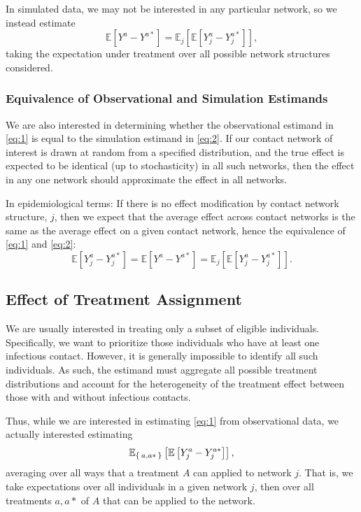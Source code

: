\documentclass{article}
\theoremstyle{definition}
\begin{document}
In simulated data, we may not be interested in any particular network, so we instead estimate
\begin{equation}\label{eq:3}
    \mathbb{E}\left[Y^{a}-Y^{a*}\right]=\mathbb{E}_{j}\left[\mathbb{E}\left[Y_{j}^{a}-Y_{j}^{a*}\right]\right],
\end{equation}
taking the expectation under treatment over all possible network structures considered. 
\subsubsection{Equivalence of Observational and Simulation Estimands}
We are also interested in determining whether the observational estimand in \ref{eq:1} is equal to the simulation estimand in \ref{eq:2}. If our contact network of interest is drawn at random from a specified distribution, and the true effect is expected to be identical (up to stochasticity) in all such networks, then the effect in any one network should approximate the effect in all networks.

In epidemiological terms: If there is no effect modification by contact network structure, $j$, then we expect that the average effect across contact networks is the same as the average effect on a given contact network, hence the equivalence of \ref{eq:1} and \ref{eq:2}:
\begin{equation}\label{eq:4}
      \mathbb{E}\left[Y_{j}^{a}-Y_{j}^{a*}\right]=\mathbb{E}\left[Y^{a}-Y^{a*}\right]=\mathbb{E}_{j}\left[\mathbb{E}\left[Y_{j}^{a}-Y_{j}^{a*}\right]\right].
\end{equation}
\subsection{Effect of Treatment Assignment}
We are usually interested in treating only a subset of eligible individuals. Specifically, we want to prioritize those individuals who have at least one infectious contact. However, it is generally impossible to identify all such individuals. As such, the estimand must aggregate all possible treatment distributions and account for the heterogeneity of the treatment effect between those with and without infectious contacts.

Thus, while we are interested in estimating \ref{eq:1} from observational data, we actually interested estimating 
\begin{equation}\label{eq:5}
    \mathbb{E}_{\Set{a,a*   }}\left[\mathbb{E}\left[Y_{j}^{a}-Y_{j}^{a*}\right]\right],
\end{equation}
averaging over all ways that a treatment $A$ can applied to network $j$. That is, we take expectations over all individuals in a given network $j$, then over all treatments $a,a*$ of $A$ that can be applied to the network.
\end{document}
